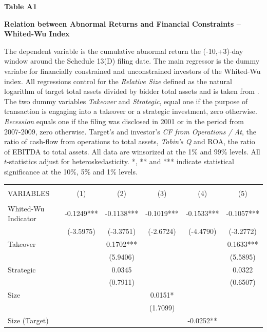 \documentclass[12pt]{article}
\begin{document}
\begin{appendices}
\begin{table}[!htbp]
	\centering
	\textbf{Table A1}\par\medskip
	\large\textbf{Relation between Abnormal Returns and Financial Constraints -- Whited-Wu Index}\par\medskip
	\justifying
	\footnotesize\noindent{} The dependent variable is the cumulative abnormal return the (-10,+3)-day window around the Schedule 13(D) filing date. The main regressor is the dummy variabe for financially constrained and unconstrained investors of the Whited-Wu index. All regressions control for the \emph{Relative Size} defined as the natural logarithm of target total assets divided by bidder total assets and is taken from \citet[p.112]{Khatami2014}. The two dummy variables \emph{Takeover} and \emph{Strategic}, equal one if the purpose of transaction is engaging into a takeover or a strategic investment, zero otherwise. \emph{Recession} equals one if the filing was disclosed in 2001 or in the period from 2007-2009, zero otherwise. Target's and investor's \emph{CF from Operations / At}, the ratio of cash-flow from operations to total assets, \emph{Tobin's Q} and ROA, the ratio of EBITDA to total assets. All data are winsorized at the 1\% and 99\% levels. All $t$-statistics adjust for heteroskedasticity. *, ** and *** indicate statistical significance at the 10\%, 5\% and 1\% levels.\par\medskip
	\begin{adjustbox}{max width=\textwidth}
		\begin{tabular}{lccccc} \hline
			\\
		   VARIABLES & (1) & (2) & (3) & (4) & (5) \\ \hline
			&  &  &  &  &  \\
		   Whited-Wu Indicator & -0.1249*** & -0.1138*** & -0.1019*** & -0.1533*** & -0.1057*** \\
			& (-3.5975) & (-3.3751) & (-2.6724) & (-4.4790) & (-3.2772) \\
		   Takeover &  & 0.1702*** &  &  & 0.1633*** \\
			&  & (5.9406) &  &  & (5.5895) \\
		   Strategic &  & 0.0345 &  &  & 0.0322 \\
			&  & (0.7911) &  &  & (0.6507) \\
		   Size &  &  & 0.0151* &  &  \\
			&  &  & (1.7099) &  &  \\
		   Size (Target) &  &  &  & -0.0252** &  \\

\end{tabular}
\end{adjustbox}
\end{table}
\end{appendices}
\end{document}
